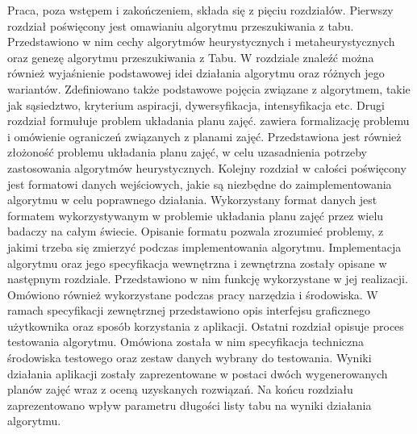 Praca, poza wstępem i zakończeniem, składa się z pięciu rozdziałów. Pierwszy rozdział poświęcony jest omawianiu algorytmu przeszukiwania z tabu. Przedstawiono w nim cechy algorytmów heurystycznych i metaheurystycznych oraz genezę algorytmu przeszukiwania z Tabu. W rozdziale znaleźć można również wyjaśnienie podstawowej idei działania algorytmu oraz różnych jego wariantów. Zdefiniowano także podstawowe pojęcia związane z algorytmem, takie jak sąsiedztwo, kryterium aspiracji, dywersyfikacja, intensyfikacja etc. Drugi rozdział formułuje problem układania planu zajęć. zawiera formalizację problemu i omówienie ograniczeń związanych z planami zajęć. Przedstawiona jest również złożoność problemu układania planu zajęć, w celu uzasadnienia potrzeby zastosowania algorytmów heurystycznych. Kolejny rozdział w całości poświęcony jest formatowi danych wejściowych, jakie są niezbędne do zaimplementowania algorytmu w celu poprawnego działania. Wykorzystany format danych jest formatem wykorzystywanym w problemie układania planu zajęć przez wielu badaczy na całym świecie. Opisanie formatu pozwala zrozumieć problemy, z jakimi trzeba się zmierzyć podczas implementowania algorytmu. Implementacja algorytmu oraz jego specyfikacja wewnętrzna i zewnętrzna zostały opisane w następnym rozdziale. Przedstawiono w nim funkcję wykorzystane w jej realizacji. Omówiono również wykorzystane podczas pracy narzędzia i środowiska. W ramach specyfikacji zewnętrznej przedstawiono opis interfejsu graficznego użytkownika oraz sposób korzystania z aplikacji. Ostatni rozdział opisuje proces testowania algorytmu. Omówiona została w nim specyfikacja techniczna środowiska testowego oraz zestaw danych wybrany do testowania. Wyniki działania aplikacji zostały zaprezentowane w postaci dwóch wygenerowanych planów zajęć wraz z oceną uzyskanych rozwiązań. Na końcu rozdziału zaprezentowano wpływ parametru długości listy tabu na wyniki działania algorytmu.